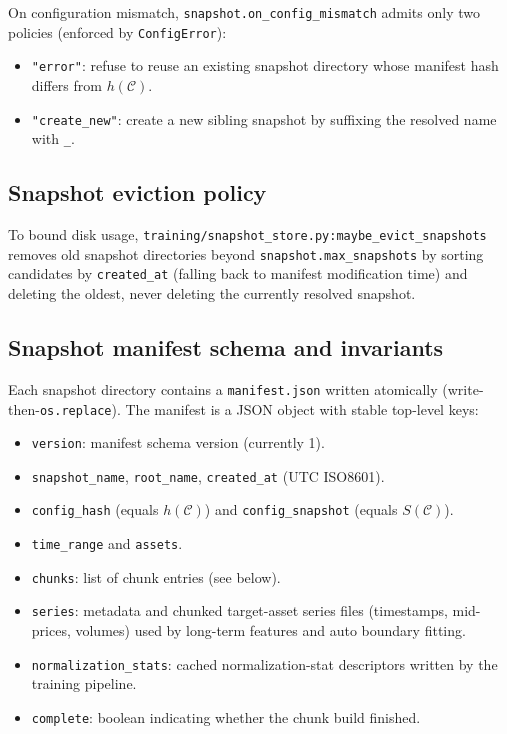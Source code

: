\documentclass[11pt]{article}
\begin{document}
On configuration mismatch, \texttt{snapshot.on\_config\_mismatch} admits only two policies (enforced by \texttt{ConfigError}):
\begin{itemize}
  \item \texttt{"error"}: refuse to reuse an existing snapshot directory whose manifest hash differs from $h(\mathcal{C})$.
  \item \texttt{"create\_new"}: create a new sibling snapshot by suffixing the resolved name with \texttt{\_<hash8>}.
\end{itemize}

\subsection{Snapshot eviction policy}

To bound disk usage, \texttt{training/snapshot\_store.py:maybe\_evict\_snapshots} removes old snapshot directories beyond \texttt{snapshot.max\_snapshots} by sorting candidates by \texttt{created\_at} (falling back to manifest modification time) and deleting the oldest, never deleting the currently resolved snapshot.

\subsection{Snapshot manifest schema and invariants}

Each snapshot directory contains a \texttt{manifest.json} written atomically (write-then-\texttt{os.replace}). The manifest is a JSON object with stable top-level keys:
\begin{itemize}
  \item \texttt{version}: manifest schema version (currently 1).
  \item \texttt{snapshot\_name}, \texttt{root\_name}, \texttt{created\_at} (UTC ISO8601).
  \item \texttt{config\_hash} (equals $h(\mathcal{C})$) and \texttt{config\_snapshot} (equals $S(\mathcal{C})$).
  \item \texttt{time\_range} and \texttt{assets}.
  \item \texttt{chunks}: list of chunk entries (see below).
  \item \texttt{series}: metadata and chunked target-asset series files (timestamps, mid-prices, volumes) used by long-term features and auto boundary fitting.
  \item \texttt{normalization\_stats}: cached normalization-stat descriptors written by the training pipeline.
  \item \texttt{complete}: boolean indicating whether the chunk build finished.
\end{itemize}
\end{document}
